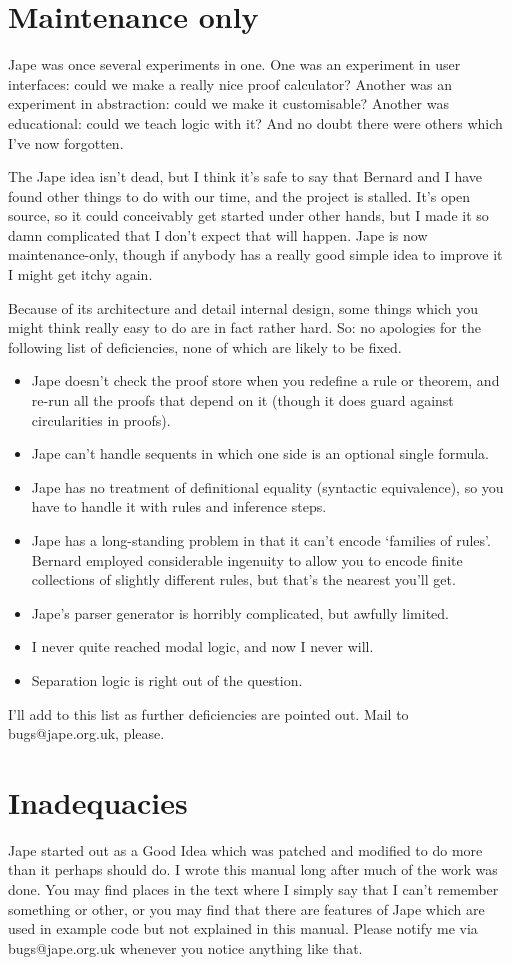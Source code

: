 \section*{Maintenance only}

Jape was once several experiments in one. One was an experiment in user interfaces: could we make a really nice proof calculator? Another was an experiment in abstraction: could we make it customisable? Another was educational: could we teach logic with it? And no doubt there were others which I've now forgotten.

The Jape idea isn't dead, but I think it's safe to say that Bernard and I have found other things to do with our time, and the project is stalled. It's open source, so it could conceivably get started under other hands, but I made it so damn complicated that I don't expect that will happen. Jape is now maintenance-only, though if anybody has a really good simple idea to improve it I might get itchy again.

Because of its architecture and detail internal design, some things which you might think really easy to do are in fact rather hard. So: no apologies for the following list of deficiencies, none of which are likely to be fixed.

\begin{itemize}
\item Jape doesn't check the proof store when you redefine a rule or theorem, and re-run all the proofs that depend on it (though it does guard against circularities in proofs).
\item Jape can't handle sequents in which one side is an optional single formula.
\item Jape has no treatment of definitional equality (syntactic equivalence), so you have to handle it with rules and inference steps.
\item Jape has a long-standing problem in that it can't encode `families of rules'. Bernard employed considerable ingenuity to allow you to encode finite collections of slightly different rules, but that's the nearest you'll get.
\item Jape's parser generator is horribly complicated, but awfully limited.
\item I never quite reached modal logic, and now I never will.
\item Separation logic is right out of the question.
\end{itemize}

I'll add to this list as further deficiencies are pointed out. Mail to bugs@jape.org.uk, please.

\section*{Inadequacies}

Jape started out as a Good Idea which was patched and modified to do more than it perhaps should do. I wrote this manual long after much of the work was done. You may find places in the text where I simply say that I can't remember something or other, or you may find that there are features of Jape which are used in example code but not explained in this manual. Please notify me via bugs@jape.org.uk whenever you notice anything like that.